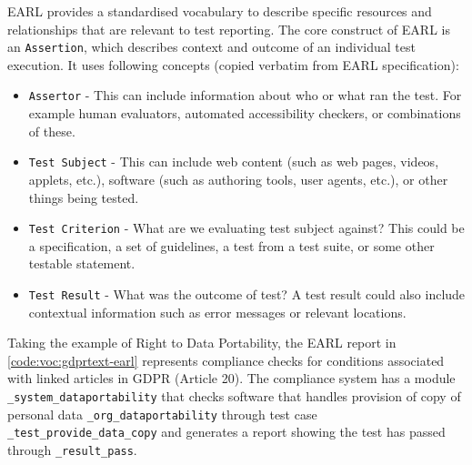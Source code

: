 EARL provides a standardised vocabulary to describe specific resources and relationships that are relevant to test reporting. The core construct of EARL is an \texttt{Assertion}, which describes context and outcome of an individual test execution. It uses following concepts (copied verbatim from EARL specification):

\begin{itemize}
    \item \texttt{Assertor} - This can include information about who or what ran the test. For example human evaluators, automated accessibility checkers, or combinations of these.
    \item \texttt{Test Subject} - This can include web content (such as web pages, videos, applets, etc.), software (such as authoring tools, user agents, etc.), or other things being tested.
    \item \texttt{Test Criterion} - What are we evaluating test subject against? This could be a specification, a set of guidelines, a test from a test suite, or some other testable statement.
    \item \texttt{Test Result} - What was the outcome of test? A test result could also include contextual information such as error messages or relevant locations.
\end{itemize}

Taking the example of Right to Data Portability, the EARL report in \autoref{code:voc:gdprtext-earl} represents compliance checks for conditions associated with linked articles in GDPR (Article 20). The compliance system has a module \texttt{\_system\_dataportability} that checks software that handles provision of copy of personal data \texttt{\_org\_dataportability} through test case \texttt{\_test\_provide\_data\_copy} and generates a report showing the test has passed through \texttt{\_result\_pass}.


